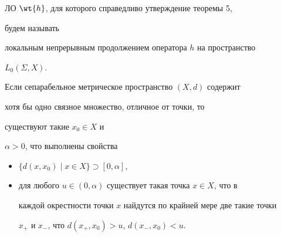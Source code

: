 ЛО $\wt{h}$, для которого справедливо утверждение теоремы 5,


будем называть


локальным непрерывным продолжением оператора $h$ на пространство


$L_0(\Sigma,X)$.





\begin{lem}


Если сепарабельное метрическое пространство $(X,d)$ содержит


хотя бы одно связное множество, отличное от точки, то


существуют такие $x_0\in X$ и


$\alpha>0$, что выполнены свойства


\begin{itemize}


\item[1)] $\{d(x,x_0)\mid x\in X\}\supset[0,\alpha]$,


\item[2)] для любого $u\in(0,\alpha)$ существует такая точка $x\in X$, что в


каждой окрестности точки $x$ найдутся по крайней мере две такие точки


$x_+$ и $x_-$, что $d(x_+,x_0)>u$, $d(x_-,x_0)<u$.


\end{itemize}


\end{lem}





